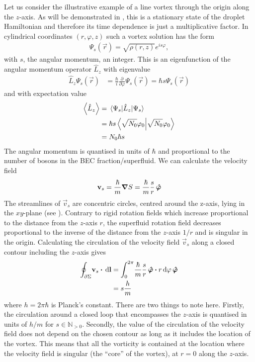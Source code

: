 			Let us consider the illustrative example of a line vortex through the origin along the $z$-axis. As will be demonstrated in , this is a stationary state of the droplet Hamiltonian and therefore its time dependence is just a multiplicative factor. In cylindrical coordinates $(r,\varphi,z)$ such a vortex solution has the form
			\begin{align}
				\Psi_s(\vec{r}) = \sqrt{\rho(r,z)}\unit{e}^{is\varphi}, \label{eq:line-vortex}
			\end{align}
			with $s$, the angular momentum, an integer. This is an eigenfunction of the angular momentum operator $\hat{L}_z$ with eigenvalue
			\begin{align}
				\hat{L}_z \Psi_s(\vec{r}) &= \frac{\hbar}{i}\frac{\partial}{\partial\varphi}\Psi_s(\vec{r}) = \hbar s\Psi_s(\vec{r})
			\end{align}
			and with expectation value
			\begin{align}
				\expval{\hat{L}_z} &= \expval{\hat{L}_z}{\Psi_s} \nonumber \\
					&= \hbar s \braket{\sqrt{N_0}\varphi_0} \nonumber \\
					&= N_0\hbar s
			\end{align}
			The angular momentum is quantised in units of $\hbar$ and proportional to the number of bosons in the BEC fraction/superfluid. We can calculate the velocity field
			\begin{align}
				\bm{\mathrm{v}}_s = \frac{\hbar}{m}\grad{S} = \frac{\hbar}{m}\frac{s}{r}\,\vu*{\varphi}
			\end{align}
			The streamlines of $\vec{v}_s$ are concentric circles, centred around the z-axis, lying in the $xy$-plane (see ). Contrary to rigid rotation fields which increase proportional to the distance from the $z$-axis $r$, the superfluid rotation field decreases proportional to the inverse of the distance from the $z$-axis $1/r$ and is singular in the origin. Calculating the circulation of the velocity field $\vec{v}_s$ along a closed contour including the $z$-axis gives
			\begin{align}
				\oint_{\partial\Sigma}\!\vec{v}_s\vdot\unit{d}\vec{l} &=
				\int_{0}^{2\pi}\!\frac{\hbar}{m}\frac{s}{r}\,\vu*{\varphi}\vdot r\unit{d}\varphi\,\vu*{\varphi} \nonumber \\
					&= s\frac{h}{m} \label{eq:circulation}
			\end{align}
			where $h=2\pi\hbar$ is Planck's constant. There are two things to note here. Firstly, the circulation around a closed loop that encompasses the $z$-axis is quantised in units of $h/m$ for $s\in\mathbb{N}_{>0}$. Secondly, the value of the circulation of the velocity field does not depend on the chosen contour as long as it includes the location of the vortex. This means that all the vorticity is contained at the location where the velocity field is singular (the ``core'' of the vortex), at $r=0$ along the $z$-axis.
			
